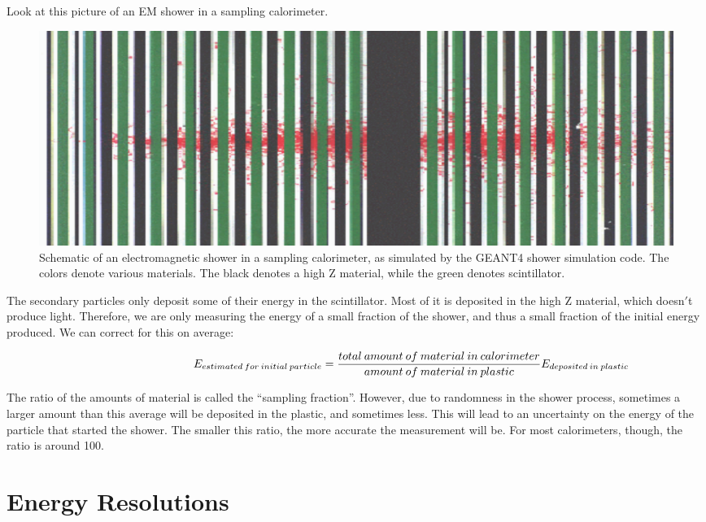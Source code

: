 \noindent
Look at this picture of an EM shower in a sampling calorimeter.


\;
\;

\begin{figure}[h]
\centering\includegraphics[scale=0.5]{./calorimetry/Pictures/fig6.pdf}
\caption{Schematic of an electromagnetic shower in a sampling calorimeter, as simulated by the GEANT4 shower simulation code. The colors denote various materials. The black denotes a high Z material, while the green denotes scintillator.}
\label{fig:cal6}
\end{figure}

\;

\noindent
The secondary particles only deposit some of their energy in the scintillator.  Most of it is deposited in the high Z material, which doesn$'$t produce light. Therefore, we are only measuring the energy of a small fraction of the shower, and thus a small fraction of the initial energy produced. We can correct for this on average:

\begin{equation}\hspace{34 mm}E_{estimated \: for \: initial\:  particle} = \frac{total \:amount\:  of\:  material \: in \: calorimeter}{amount \: of \: material\:  in \: plastic} E_{deposited \: in \: plastic}\end{equation}

\;
\;

\noindent
The ratio of the amounts of material is called the ``sampling fraction''. However, due to randomness in the shower process, sometimes a larger amount than this average will be deposited in the plastic, and sometimes less. This will lead to an uncertainty on the energy of the particle that started the shower. The smaller this ratio, the more accurate the measurement will be. For most calorimeters, though, the ratio is around 100.

\section{Energy Resolutions}

